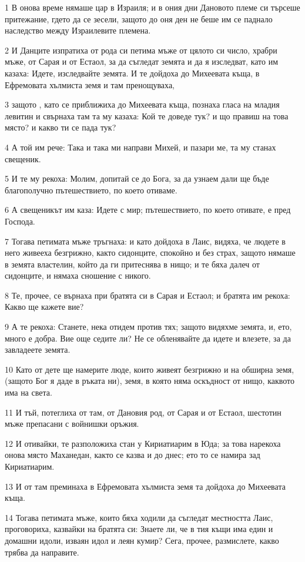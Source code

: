 \par 1 В онова време нямаше цар в Израиля; и в ония дни Дановото племе си търсеше притежание, гдето да се зесели, защото до оня ден не беше им се паднало наследство между Израилевите племена.
\par 2 И Данците изпратиха от рода си петима мъже от цялото си число, храбри мъже, от Сарая и от Естаол, за да съгледат земята и да я изследват, като им казаха: Идете, изследвайте земята. И те дойдоха до Михеевата къща, в Ефремовата хълмиста земя и там пренощуваха,
\par 3 защото , като се приближиха до Михеевата къща, познаха гласа на младия левитин и свърнаха там та му казаха: Кой те доведе тук? и що правиш на това място? и какво ти се пада тук?
\par 4 А той им рече: Така и така ми направи Михей, и пазари ме, та му станах свещеник.
\par 5 И те му рекоха: Молим, допитай се до Бога, за да узнаем дали ще бъде благополучно пътешествието, по което отиваме.
\par 6 А свещеникът им каза: Идете с мир; пътешествието, по което отивате, е пред Господа.
\par 7 Тогава петимата мъже тръгнаха: и като дойдоха в Лаис, видяха, че людете в него живееха безгрижно, както сидонците, спокойно и без страх, защото нямаше в земята властелин, който да ги притеснява в нищо; и те бяха далеч от сидонците, и нямаха сношение с никого.
\par 8 Те, прочее, се върнаха при братята си в Сарая и Естаол; и братята им рекоха: Какво ще кажете вие?
\par 9 А те рекоха: Станете, нека отидем против тях; защото видяхме земята, и, ето, много е добра. Вие още седите ли? Не се обленявайте да идете и влезете, за да завладеете земята.
\par 10 Като от дете ще намерите люде, които живеят безгрижно и на обширна земя, (защото Бог я даде в ръката ни), земя, в която няма оскъдност от нищо, каквото има на света.
\par 11 И тъй, потеглиха от там, от Дановия род, от Сарая и от Естаол, шестотин мъже препасани с войнишки оръжия.
\par 12 И отивайки, те разположиха стан у Кириатиарим в Юда; за това нарекоха онова място Маханедан, както се казва и до днес; ето то се намира зад Кириатиарим.
\par 13 И от там преминаха в Ефремовата хълмиста земя та дойдоха до Михеевата къща.
\par 14 Тогава петимата мъже, които бяха ходили да съгледат местността Лаис, проговориха, казвайки на братята си: Знаете ли, че в тия къщи има един и домашни идоли, изваян идол и леян кумир? Сега, прочее, размислете, какво трябва да направите.
